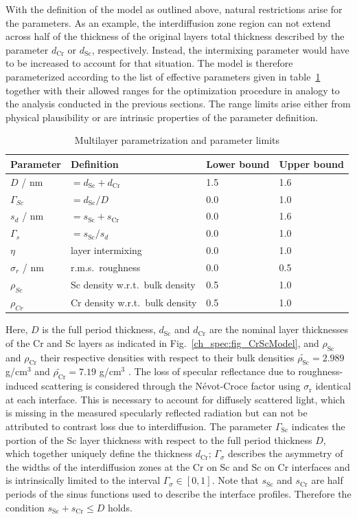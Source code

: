 With the definition of the model as outlined above, natural restrictions arise for the parameters. As an example, the interdiffusion zone region can not extend across half of the thickness of the original layers total thickness described by the parameter $d_\text{Cr}$ or $d_\text{Sc}$, respectively. Instead, the intermixing parameter would have to be increased to account for that situation. The model is therefore parameterized according to the list of effective parameters given in table~\ref{ch_spec:tbl_CrSc_gradual_parametrization} together with their allowed ranges for the optimization procedure in analogy to the analysis conducted in the previous sections. The range limits arise either from physical plausibility or are intrinsic properties of the parameter definition.
\begin{table}[htbp]
\centering
\caption{Multilayer parametrization and parameter limits}
\label{ch_spec:tbl_CrSc_gradual_parametrization}
\begin{tabular}{@{}llll@{}}
\toprule
Parameter & Definition & Lower bound & Upper bound\\ \midrule
$D$ / nm & $= d_\text{Sc} + d_\text{Cr}$ & 1.5&1.6 \\ 
$\Gamma_{Sc}$ & $= d_\text{Sc} / D$&0.0 &1.0 \\ 
$s_d$ / nm&$=s_\text{Sc} + s_\text{Cr}$&0.0 & 1.6\\ 
$\Gamma_s$ &$= s_\text{Sc} / s_d$& 0.0& 1.0\\ 
$\eta$ &layer intermixing& 0.0& 1.0\\ 
$\sigma_r$ / nm & r.m.s.~roughness& 0.0& 0.5\\ 
$\rho_{Sc}$ &Sc density w.r.t.~bulk density & 0.5& 1.0\\ 
$\rho_{Cr}$ &Cr density w.r.t.~bulk density& 0.5& 1.0\\ 
 \bottomrule
\end{tabular}
\end{table}
Here, $D$ is the full period thickness, $d_\text{Sc}$ and $d_\text{Cr}$ are the 
nominal layer thicknesses of the Cr and Sc layers as indicated in 
Fig.~\ref{ch_spec:fig_CrScModel}, and $\rho_\text{Sc}$ and $\rho_\text{Cr}$ their 
respective densities with respect to their bulk densities 
$\tilde{\rho_\text{Sc}} = 2.989$ g/cm$^3$ and $\tilde{\rho_\text{Cr}} = 7.19$ 
g/cm$^3$ \cite{henke_x-ray_1993}. The loss of specular 
reflectance due to roughness-induced scattering is considered through the 
N\'{e}vot-Croce factor using $\sigma_\text{r}$ identical at each interface. This is necessary to account for diffusely scattered light, which is missing in the measured specularly reflected radiation but can not be attributed to contrast loss due to interdiffusion. The parameter $\Gamma_\text{Sc}$ indicates the portion of the Sc layer thickness 
with respect to the full period thickness $D$, which together uniquely define the thickness $d_\text{Cr}$; $\Gamma_\sigma$ describes the 
asymmetry of the widths of the interdiffusion zones at the Cr on Sc and Sc on Cr 
interfaces and is intrinsically limited to the interval $\Gamma_\sigma \in [0,1]$. Note that 
$s_\text{Sc}$ and $s_\text{Cr}$ are half periods of the sinus functions used to 
describe the interface profiles. Therefore the condition $s_\text{Sc} + 
s_\text{Cr} \leq D$ holds.

